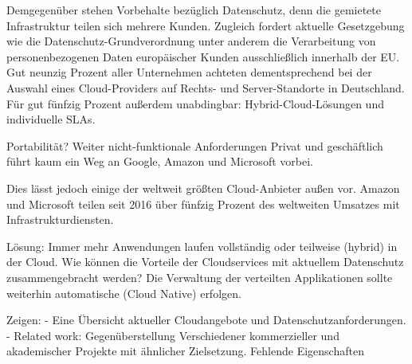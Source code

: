 Demgegenüber stehen Vorbehalte bezüglich Datenschutz, denn die gemietete Infrastruktur teilen sich mehrere Kunden. Zugleich fordert aktuelle Gesetzgebung wie die Datenschutz-Grundverordnung unter anderem die Verarbeitung von personenbezogenen Daten europäischer Kunden ausschließlich innerhalb der EU. %
Gut neunzig Prozent aller Unternehmen achteten dementsprechend bei der Auswahl eines Cloud-Providers auf Rechts- und Server-Standorte in Deutschland. Für gut fünfzig Prozent außerdem unabdingbar: Hybrid-Cloud-Lösungen und individuelle SLAs.

Portabilität? Weiter nicht-funktionale Anforderungen
Privat und geschäftlich führt kaum ein Weg an Google, Amazon und Microsoft vorbei. 


Dies lässt jedoch einige der weltweit größten Cloud-Anbieter außen vor. Amazon und Microsoft teilen seit 2016 über fünfzig Prozent des weltweiten Umsatzes mit Infrastrukturdiensten. %



Lösung: Immer mehr Anwendungen laufen vollständig oder teilweise (hybrid) in der Cloud. Wie können die Vorteile der Cloudservices mit aktuellem Datenschutz zusammengebracht werden? Die Verwaltung der verteilten Applikationen sollte weiterhin automatische (Cloud Native) erfolgen.

Zeigen: 
- Eine Übersicht aktueller Cloudangebote und Datenschutzanforderungen.
- Related work: Gegenüberstellung Verschiedener kommerzieller und akademischer Projekte mit ähnlicher Zielsetzung. Fehlende Eigenschaften

